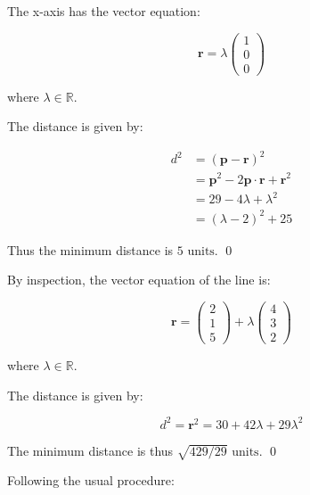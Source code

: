 \documentclass[12pt]{article}
\begin{document}
The x-axis has the vector equation:

\begin{equation}
    \mathbf{r} = \lambda \begin{pmatrix}
        1 \\
        0 \\
        0
    \end{pmatrix}
\end{equation}

where $\lambda \in \mathbb{R}$.

The distance is given by:

\begin{equation}
    \begin{split}
        d^{2} &= (\mathbf{p} - \mathbf{r})^{2} \\
        &= \mathbf{p}^{2} - 2 \mathbf{p} \cdot \mathbf{r} + \mathbf{r}^{2} \\
        &= 29 - 4\lambda + \lambda^{2} \\
        &= (\lambda - 2)^{2} + 25
    \end{split}
\end{equation}

Thus the minimum distance is $5 \text{ units}$.
\qed


By inspection, the vector equation of the line is:

\begin{equation}
    \mathbf{r} =
    \begin{pmatrix}
        2 \\
        1 \\
        5
    \end{pmatrix} +
    \lambda \begin{pmatrix}
        4 \\
        3 \\
        2
    \end{pmatrix}
\end{equation}

where $\lambda \in \mathbb{R}$.

The distance is given by:

\begin{equation}
    d^{2} = \mathbf{r}^{2} = 30 + 42\lambda + 29\lambda^{2}
\end{equation}

The minimum distance is thus $\sqrt{429/29} \text{ units}$.
\qed

Following the usual procedure:
\end{document}

